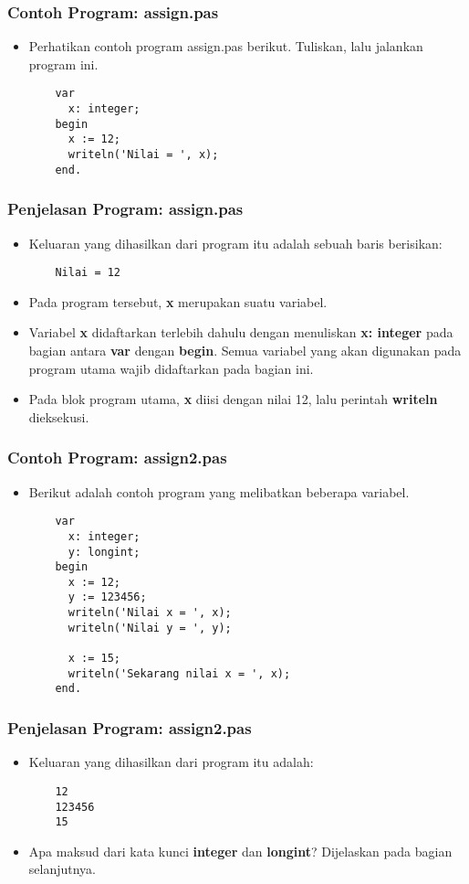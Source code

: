 \begin{frame}[fragile]
\frametitle{Contoh Program: assign.pas}
\begin{itemize}
  \item Perhatikan contoh program assign.pas berikut. Tuliskan, lalu jalankan program ini.
  \begin{lstlisting}
    var
      x: integer;
    begin
      x := 12;
      writeln('Nilai = ', x);
    end.
  \end{lstlisting}
\end{itemize}
\end{frame}

\begin{frame}[fragile]
\frametitle{Penjelasan Program: assign.pas}
\begin{itemize}
  \item Keluaran yang dihasilkan dari program itu adalah sebuah baris berisikan:
  \begin{lstlisting}
    Nilai = 12
  \end{lstlisting}
  \item Pada program tersebut, \textbf{x} merupakan suatu variabel.
  \item Variabel \textbf{x} didaftarkan terlebih dahulu dengan menuliskan \textbf{x: integer} pada bagian antara \textbf{var} dengan \textbf{begin}. Semua variabel yang akan digunakan pada program utama wajib didaftarkan pada bagian ini.
  \item Pada blok program utama, \textbf{x} diisi dengan nilai 12, lalu perintah \textbf{writeln} dieksekusi.
\end{itemize}
\end{frame}

\begin{frame}[fragile]
\frametitle{Contoh Program: assign2.pas}
\begin{itemize}
  \item Berikut adalah contoh program yang melibatkan beberapa variabel.
  \begin{lstlisting}
    var
      x: integer;
      y: longint;
    begin
      x := 12;
      y := 123456;
      writeln('Nilai x = ', x);
      writeln('Nilai y = ', y);

      x := 15;
      writeln('Sekarang nilai x = ', x);
    end.
  \end{lstlisting}
\end{itemize}
\end{frame}

\begin{frame}[fragile]
\frametitle{Penjelasan Program: assign2.pas}
\begin{itemize}
  \item Keluaran yang dihasilkan dari program itu adalah:
  \begin{lstlisting}
    12
    123456
    15
  \end{lstlisting}
  \item Apa maksud dari kata kunci \textbf{integer} dan \textbf{longint}? Dijelaskan pada bagian selanjutnya.
\end{itemize}
\end{frame}

